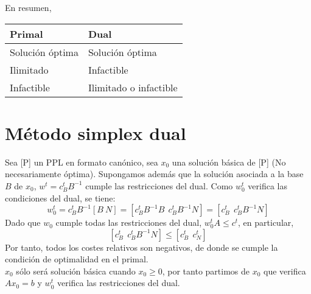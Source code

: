 \documentclass[11pt,fleqn]{book} %
\begin{document}
En resumen,
\begin{center}
  \begin{tabular}{|l|l|}
	\hline
	\textbf{Primal} & \textbf{Dual} \\ \hline
	Solución óptima & Solución óptima \\ \hline
	Ilimitado & Infactible \\ \hline
	Infactible & Ilimitado o infactible \\ \hline
  \end{tabular}
\end{center}

\section{Método simplex dual}
Sea [P] un PPL en formato canónico, sea $x_0$ una solución básica de [P] (No necesariamente óptima). Supongamos además que la solución asociada a la base $B$ de $x_0$, $w^t = c_B^t B^{-1}$ cumple las restricciones del dual. Como $w_0^t$ verifica las condiciones del dual, se tiene: $$w_0^t= c_B^t B^{-1} [B ~ N]=[c_B^tB^{-1} B ~~ c_B^t B^{-1} N]=[c_B^t ~~ c_B^t B^{-1} N]$$
Dado que $w_0$ cumple todas las restricciones del dual, $w_0^t A \leq c^t$, en particular, 
$$ [c_B^t ~~ c_B^t B^{-1} N] \leq [c_B^t ~~ c_N^t]$$
Por tanto, todos los costes relativos son negativos, de donde  se cumple la condición de optimalidad en el primal. \\
$x_0$ sólo será solución básica cuando $x_0 \geq 0$, por tanto partimos de $x_0$ que verifica $Ax_0 = b$ y $w_0^t$ verifica las restricciones del dual.
\end{document}
